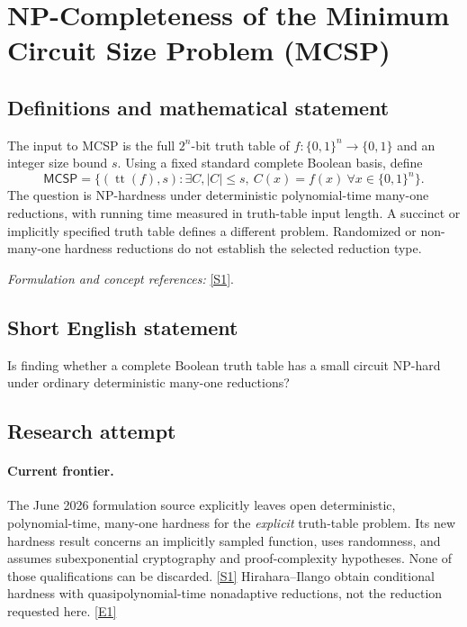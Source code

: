 \documentclass[11pt,a4paper]{article}
\newcommand{\sref}[2]{\hyperlink{source:#1:#2}{[S#2]}}
\newcommand{\eref}[2]{\hyperlink{extra:#1:#2}{[E#2]}}
\newif\ifshowcatalogue
\newcommand{\cataloguescope}[1]{\ifshowcatalogue
 \paragraph{Exact scope in the supplied catalogue.}
 \begin{quote}\small #1\end{quote}\fi}
\numberwithin{equation}{section}
\begin{document}
\setcounter{section}{0}
\clearpage
\section*{\texorpdfstring{NP-Completeness of the Minimum Circuit Size Problem (MCSP)}{NP-Completeness of the Minimum Circuit Size Problem (MCSP)}}\label{30006744}
\subsection{Definitions and mathematical statement}
The input to MCSP is the full $2^n$-bit truth table of $f:\{0,1\}^n\to\{0,1\}$ and an integer size bound $s$. Using a fixed standard complete Boolean basis, define
\[
 \mathsf{MCSP}=\{(\operatorname{tt}(f),s):\exists C,
                          |C|\le s,\ C(x)=f(x)\ \forall x\in\{0,1\}^n\}.
\]
The question is NP-hardness under deterministic polynomial-time many-one reductions, with running time measured in truth-table input length. A succinct or implicitly specified truth table defines a different problem. Randomized or non-many-one hardness reductions do not establish the selected reduction type.
\par\smallskip\textit{Formulation and concept references:} \sref{30006744}{1}.
\cataloguescope{Prove or disprove that MCSP is NP-hard under deterministic polynomial-time many-one reductions, where an input is the truth table of a Boolean function and a size bound and asks whether a circuit of at most that size computes the function.}
\subsection{Short English statement}
Is finding whether a complete Boolean truth table has a small circuit NP-hard under ordinary deterministic many-one reductions?
\subsection{Research attempt}

\paragraph{Current frontier.}
The June 2026 formulation source explicitly leaves open deterministic,
polynomial-time, many-one hardness for the \emph{explicit} truth-table
problem. Its new hardness result concerns an implicitly sampled function,
uses randomness, and assumes subexponential cryptography and proof-complexity
hypotheses. None of those qualifications can be discarded.
\sref{30006744}{1} Hirahara--Ilango obtain conditional hardness with
quasipolynomial-time nonadaptive reductions, not the reduction requested
here. \eref{30006744}{1}
\end{document}
